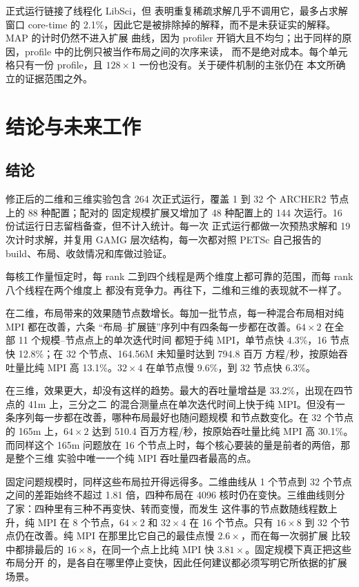 \documentclass[11pt,a4paper,oneside]{report}
\begin{document}
正式运行链接了线程化 LibSci，但  表明重复稀疏求解几乎不调用它，最多占求解
窗口 core-time 的 2.1\%，因此它是被排除掉的解释，而不是未获证实的解释。MAP 的计时仍然不进入扩展
曲线，因为 profiler 开销大且不均匀；出于同样的原因，profile 中的比例只被当作布局之间的次序来读，
而不是绝对成本。每个单元格只有一份 profile，且 $128\times1$ 一份也没有。关于硬件机制的主张仍在
本文所确立的证据范围之外。

\chapter{结论与未来工作}
\label{ch:conclusion}

\section{结论}
\label{sec:conclusions}
修正后的二维和三维实验包含 264 次正式运行，覆盖 1 到 32 个 ARCHER2 节点上的 88 种配置；配对的
固定规模扩展又增加了 48 种配置上的 144 次运行。16 份试运行日志留档备查，但不计入统计。每一次
正式运行都做一次预热求解和 19 次计时求解，并复用 GAMG 层次结构，每一次都对照 PETSc 自己报告的
build、布局、收敛情况和库做过验证。

每核工作量恒定时，每 rank 二到四个线程是两个维度上都可靠的范围，而每 rank 八个线程在两个维度上
都没有竞争力。再往下，二维和三维的表现就不一样了。

在二维，布局带来的效果随节点数增长。每加一批节点，每一种混合布局相对纯 MPI 都在改善，六条
“布局--扩展链”序列中有四条每一步都在改善。$64\times2$ 在全部 11 个规模--节点点上的单次迭代时间
都短于纯 MPI，单节点快 4.3\%，16 节点快 12.8\%；在 32 个节点、164.56M 未知量时达到 794.8 百万
方程/秒，按原始吞吐量比纯 MPI 高 13.1\%。$32\times4$ 在单节点慢 9.6\%，到 32 节点快 6.3\%。

在三维，效果更大，却没有这样的趋势。最大的吞吐量增益是 33.2\%，出现在四节点的 41m 上，三分之二
的混合测量点在单次迭代时间上快于纯 MPI。但没有一条序列每一步都在改善，哪种布局最好也随问题规模
和节点数变化。在 32 个节点的 165m 上，$64\times2$ 达到 510.4 百万方程/秒，按原始吞吐量比纯 MPI
高 30.1\%。而同样这个 165m 问题放在 16 个节点上时，每个核心要装的量是前者的两倍，那是整个三维
实验中唯一一个纯 MPI 吞吐量四者最高的点。

固定问题规模时，同样这些布局拉开得远得多。二维曲线从 1 个节点到 32 个节点之间的差距始终不超过
1.81 倍，四种布局在 4096 核时仍在变快。三维曲线则分了家：四种里有三种不再变快、转而变慢，而发生
这件事的节点数随线程数上升，纯 MPI 在 8 个节点，$64\times2$ 和 $32\times4$ 在 16 个节点。只有
$16\times8$ 到 32 个节点仍在改善。纯 MPI 在那里比它自己的最佳点慢 $2.6\times$，而在每一次弱扩展
比较中都排最后的 $16\times8$，在同一个点上比纯 MPI 快 $3.81\times$。固定规模下真正把这些布局分开
的，是各自在哪里停止变快，因此任何建议都必须写明它所依据的扩展场景。
\end{document}
